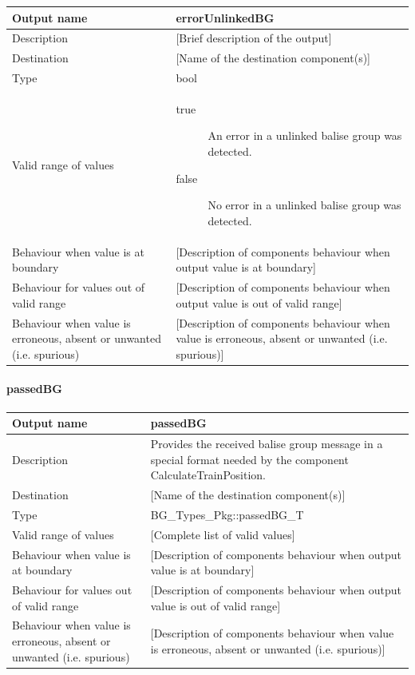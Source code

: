 \begin{longtable}{p{}p{}}
\toprule
Output name				& errorUnlinkedBG \\
\midrule
Description				& [Brief description of the output] \\
\midrule
Destination				& [Name of the destination component(s)] \\ 
\midrule
Type					& bool \\
\midrule
Valid range of values	& \begin{description}
\item[true] An error in a unlinked balise group was detected.
\item[false] No error in a unlinked balise group was detected.
\end{description} \\
\midrule
Behaviour when value is at boundary	& [Description of components behaviour when output value is at boundary] \\
\midrule
Behaviour for values out of valid range	& [Description of components behaviour when output value is out of valid range] \\
\midrule
Behaviour when value is erroneous, absent or unwanted (i.e. spurious) & [Description of components behaviour when value is erroneous, absent or unwanted (i.e. spurious)] \\
\bottomrule
\end{longtable}

\paragraph{passedBG}

\begin{longtable}{p{}p{}}
\toprule
Output name				& passedBG \\
\midrule
Description				& Provides the received balise group message in a special format needed by the component CalculateTrainPosition. \\
\midrule
Destination				& [Name of the destination component(s)] \\ 
\midrule
Type					& BG\_Types\_Pkg::passedBG\_T \\
\midrule
Valid range of values	& [Complete list of valid values] \\
\midrule
Behaviour when value is at boundary	& [Description of components behaviour when output value is at boundary] \\
\midrule
Behaviour for values out of valid range	& [Description of components behaviour when output value is out of valid range] \\
\midrule
Behaviour when value is erroneous, absent or unwanted (i.e. spurious) & [Description of components behaviour when value is erroneous, absent or unwanted (i.e. spurious)] \\
\bottomrule
\end{longtable}


